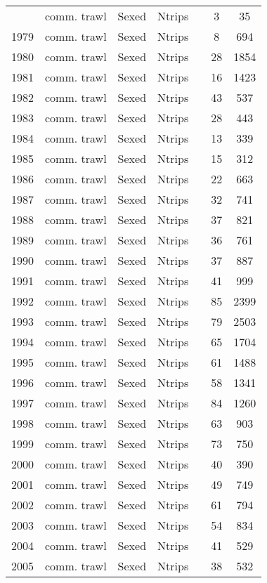 \begin{longtable}[t]{c>{\centering\arraybackslash}p{3cm}ccccc}
\endfoot
\bottomrule
\endlastfoot
1978 & comm. trawl & Sexed & Ntrips &  & 3 & 35\\
1979 & comm. trawl & Sexed & Ntrips &  & 8 & 694\\
1980 & comm. trawl & Sexed & Ntrips &  & 28 & 1854\\
1981 & comm. trawl & Sexed & Ntrips &  & 16 & 1423\\
1982 & comm. trawl & Sexed & Ntrips &  & 43 & 537\\
1983 & comm. trawl & Sexed & Ntrips &  & 28 & 443\\
1984 & comm. trawl & Sexed & Ntrips &  & 13 & 339\\
1985 & comm. trawl & Sexed & Ntrips &  & 15 & 312\\
1986 & comm. trawl & Sexed & Ntrips &  & 22 & 663\\
1987 & comm. trawl & Sexed & Ntrips &  & 32 & 741\\
1988 & comm. trawl & Sexed & Ntrips &  & 37 & 821\\
1989 & comm. trawl & Sexed & Ntrips &  & 36 & 761\\
1990 & comm. trawl & Sexed & Ntrips &  & 37 & 887\\
1991 & comm. trawl & Sexed & Ntrips &  & 41 & 999\\
1992 & comm. trawl & Sexed & Ntrips &  & 85 & 2399\\
1993 & comm. trawl & Sexed & Ntrips &  & 79 & 2503\\
1994 & comm. trawl & Sexed & Ntrips &  & 65 & 1704\\
1995 & comm. trawl & Sexed & Ntrips &  & 61 & 1488\\
1996 & comm. trawl & Sexed & Ntrips &  & 58 & 1341\\
1997 & comm. trawl & Sexed & Ntrips &  & 84 & 1260\\
1998 & comm. trawl & Sexed & Ntrips &  & 63 & 903\\
1999 & comm. trawl & Sexed & Ntrips &  & 73 & 750\\
2000 & comm. trawl & Sexed & Ntrips &  & 40 & 390\\
2001 & comm. trawl & Sexed & Ntrips &  & 49 & 749\\
2002 & comm. trawl & Sexed & Ntrips &  & 61 & 794\\
2003 & comm. trawl & Sexed & Ntrips &  & 54 & 834\\
2004 & comm. trawl & Sexed & Ntrips &  & 41 & 529\\
2005 & comm. trawl & Sexed & Ntrips &  & 38 & 532\\

\end{longtable}

